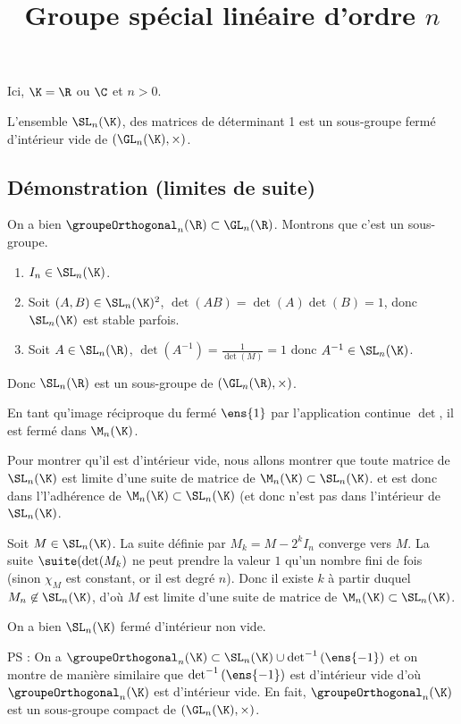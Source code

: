 \documentclass[fontsize=12pt,twoside=false,parskip=half, french]{scrartcl}
\title{Groupe spécial linéaire d’ordre $n$}
\date{}
\author{}
\begin{document}
\maketitle
   Ici, $\K = \R$ ou $\C$ et $n > 0$.
   \begin{Theoreme}
      L’ensemble $\SL_n(\K)$, des matrices de déterminant 1 est un sous-groupe
      fermé d'intérieur vide de $(\GL_n(\K), \times)$.
   \end{Theoreme}
   \subsection{Démonstration (limites de suite)}
      On a bien $\groupeOrthogonal_n(\R) \subset \GL_n(\R)$. Montrons que
      c’est un sous-groupe.
      \begin{enumerate}
         \item $I_n \in \SL_n(\K)$.
         \item Soit $(A, B) \in \SL_n(\K)^2$, $\det(AB) = \det(A)\det(B) = 1$,
               donc $\SL_n(\K)$ est stable parfois.
         \item Soit $A \in \SL_n(\R)$, $\det\left(A^{-1}\right) = \frac{1}{\det(M)} = 1$
               donc $A^{-1} \in \SL_n(\K)$.         
      \end{enumerate}
      Donc $\SL_n(\R)$ est un sous-groupe de $(\GL_n(\R), \times)$.
      
     En tant qu’image réciproque du fermé $\ens{1}$ par l’application continue 
     $\det$, il est fermé dans $\M_n(\K)$.
     
     Pour montrer qu'il est d'intérieur vide, nous allons montrer que toute matrice de 
     $\SL_n(\K)$ est limite d'une suite de matrice de $\M_n(\K) \subset \SL_n(\K)$.
     et est donc dans l'l'adhérence de $\M_n(\K) \subset \SL_n(\K)$ (et donc
     n'est pas dans l'intérieur de $\SL_n(\K)$.  
     
     Soit $M \in \SL_n(\K)$. La suite définie par $M_k = M - 2^k I_n$ converge 
     vers $M$. La suite $\suite(\det(M_k)$ ne peut prendre la valeur $1$ qu'un 
     nombre fini de fois (sinon $\chi_M$ est constant, or il est degré $n$). 
     Donc il existe $k$ à partir duquel $M_n \not\in \SL_n(\K)$, d'où $M$ 
     est limite d'une suite de matrice de $\M_n(\K) \subset \SL_n(\K)$. 
     
     On a bien $\SL_n(\K)$ fermé d'intérieur non vide.
     
     PS : On a $\groupeOrthogonal_n(\K) \subset \SL_n(\K) \cup \det^{-1}\left(\ens{-1}\right)$
     et on montre de manière similaire que $\det^{-1}\left(\ens{-1}\right)$ est
     d'intérieur vide d'où $\groupeOrthogonal_n(\K)$ est d'intérieur vide. En 
     fait, $\groupeOrthogonal_n(\K)$ est un sous-groupe compact de $(\GL_n(\K), \times)$. 
\end{document}
